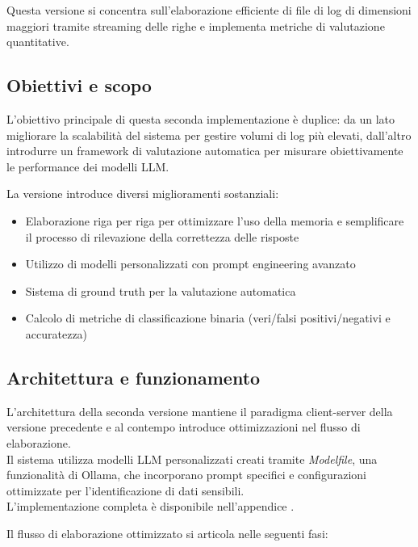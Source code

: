 \documentclass[12pt]{report}
\begin{document}
Questa versione si concentra sull'elaborazione efficiente di file di log di dimensioni maggiori tramite streaming delle righe e implementa metriche di valutazione quantitative.

\subsection{Obiettivi e scopo}
\label{subsec:ver2_obiettivi}

L'obiettivo principale di questa seconda implementazione è duplice: da un lato migliorare la scalabilità del sistema per gestire volumi di log più elevati, dall'altro introdurre un framework di valutazione automatica per misurare obiettivamente le performance dei modelli LLM.

La versione introduce diversi miglioramenti sostanziali:
\begin{itemize}
    \item Elaborazione riga per riga per ottimizzare l'uso della memoria e semplificare il processo di rilevazione della correttezza delle risposte
    \item Utilizzo di modelli personalizzati con prompt engineering avanzato
    \item Sistema di ground truth per la valutazione automatica
    \item Calcolo di metriche di classificazione binaria (veri/falsi positivi/negativi e accuratezza)
\end{itemize}

\subsection{Architettura e funzionamento}
\label{subsec:ver2_architettura}

L'architettura della seconda versione mantiene il paradigma client-server della versione precedente e al contempo introduce ottimizzazioni nel flusso di elaborazione. \\
Il sistema utilizza modelli LLM personalizzati creati tramite \textit{Modelfile}, una funzionalità di Ollama, che incorporano prompt specifici e configurazioni ottimizzate per l'identificazione di dati sensibili.\\
L'implementazione completa è disponibile nell'appendice .

Il flusso di elaborazione ottimizzato si articola nelle seguenti fasi:
\end{document}
